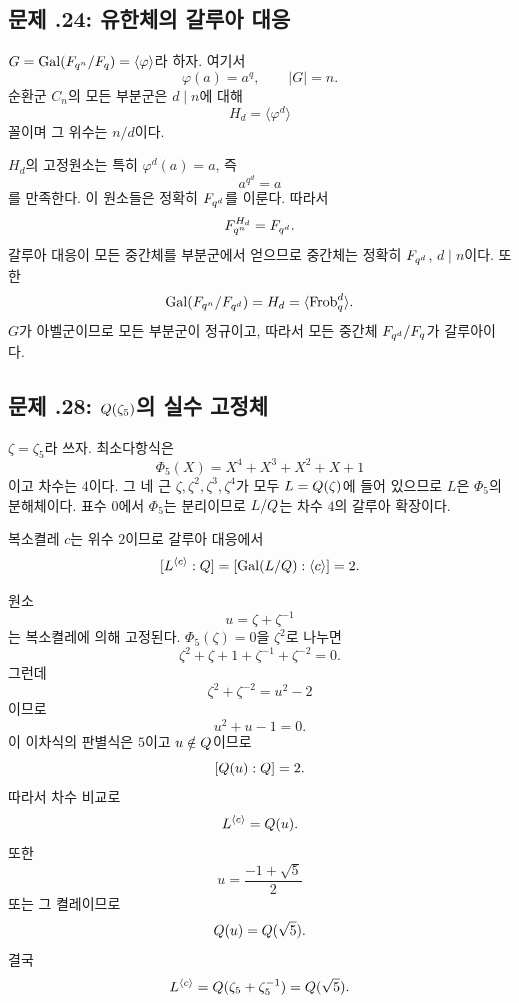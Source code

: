\subsection*{문제 \thechapter.24: 유한체의 갈루아 대응}

\begin{solution}
$G=\operatorname{Gal}(F_{q^n}/F_q)=\langle\varphi\rangle$라 하자. 여기서
\[
  \varphi(a)=a^q,
  \qquad |G|=n.
\]
순환군 $C_n$의 모든 부분군은 $d\mid n$에 대해
\[
  H_d=\langle\varphi^d\rangle
\]
꼴이며 그 위수는 $n/d$이다.

$H_d$의 고정원소는 특히 $\varphi^d(a)=a$, 즉
\[
  a^{q^d}=a
\]
를 만족한다. 이 원소들은 정확히 $F_{q^d}$를 이룬다. 따라서
\[
  F_{q^n}^{H_d}=F_{q^d}.
\]
갈루아 대응이 모든 중간체를 부분군에서 얻으므로 중간체는 정확히 $F_{q^d}$, $d\mid n$이다. 또한
\[
  \operatorname{Gal}(F_{q^n}/F_{q^d})=H_d=\langle\operatorname{Frob}_q^d\rangle.
\]
$G$가 아벨군이므로 모든 부분군이 정규이고, 따라서 모든 중간체 $F_{q^d}/F_q$가 갈루아이다.
\end{solution}

\subsection*{문제 \thechapter.28: $Q(\zeta_5)$의 실수 고정체}

\begin{solution}
$\zeta=\zeta_5$라 쓰자. 최소다항식은
\[
  \Phi_5(X)=X^4+X^3+X^2+X+1
\]
이고 차수는 $4$이다. 그 네 근 $\zeta,\zeta^2,\zeta^3,\zeta^4$가 모두 $L=Q(\zeta)$에 들어 있으므로 $L$은 $\Phi_5$의 분해체이다. 표수 $0$에서 $\Phi_5$는 분리이므로 $L/Q$는 차수 $4$의 갈루아 확장이다.

복소켤레 $c$는 위수 $2$이므로 갈루아 대응에서
\[
  [L^{\langle c\rangle}:Q]
  =[\operatorname{Gal}(L/Q):\langle c\rangle]
  =2.
\]

원소
\[
  u=\zeta+\zeta^{-1}
\]
는 복소켤레에 의해 고정된다. $\Phi_5(\zeta)=0$을 $\zeta^2$로 나누면
\[
  \zeta^2+\zeta+1+\zeta^{-1}+\zeta^{-2}=0.
\]
그런데
\[
  \zeta^2+\zeta^{-2}=u^2-2
\]
이므로
\[
  u^2+u-1=0.
\]
이 이차식의 판별식은 $5$이고 $u\notin Q$이므로
\[
  [Q(u):Q]=2.
\]
따라서 차수 비교로
\[
  L^{\langle c\rangle}=Q(u).
\]
또한
\[
  u=\frac{-1+\sqrt5}{2}
\]
또는 그 켤레이므로
\[
  Q(u)=Q(\sqrt5).
\]
결국
\[
  L^{\langle c\rangle}
  =Q(\zeta_5+\zeta_5^{-1})
  =Q(\sqrt5).
\]
\end{solution}
